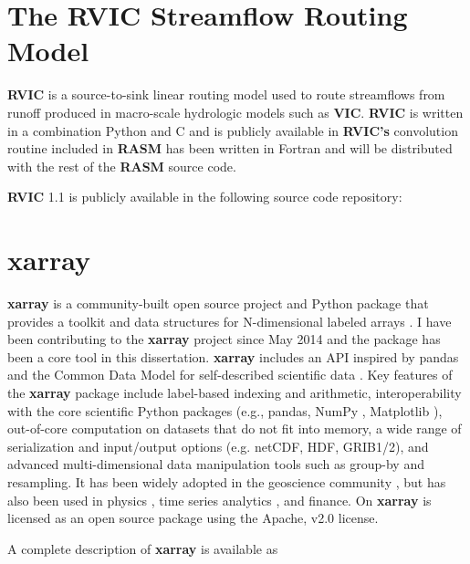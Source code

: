 \section{The RVIC Streamflow Routing Model}
\label{sec:rvic_dev}

\textbf{RVIC} is a source-to-sink linear routing model used to route streamflows from runoff produced in macro-scale hydrologic models such as \textbf{VIC}.
\textbf{RVIC} is written in a combination Python and C and is publicly available in \citet{Hamman_2015}
\textbf{RVIC's} convolution routine included in \textbf{RASM} has been written in Fortran and will be distributed with the rest of the \textbf{RASM} source code.

\textbf{RVIC} 1.1 is publicly available in the following source code repository:


\section{xarray}
\label{sec:xarray_dev}

\textbf{xarray} is a community-built open source project and Python package that provides a toolkit and data structures for N-dimensional labeled arrays \citep{Hoyer_2016}.
I have been contributing to the \textbf{xarray} project since May 2014 and the package has been a core tool in this dissertation.
\textbf{xarray} includes an API inspired by pandas \citep{mckinney_2010} and the Common Data Model for self-described scientific data \citep{Rew_1990,Brown_1993}.
Key features of the \textbf{xarray} package include label-based indexing and arithmetic, interoperability with the core scientific Python packages (e.g., pandas, NumPy \citep{Jones_2001}, Matplotlib \citep{van_der_Walt_2011}), out-of-core computation on datasets that do not fit into memory, a wide range of serialization and input/output options (e.g. netCDF, HDF, GRIB1/2), and advanced multi-dimensional data manipulation tools such as group-by and resampling.
It has been widely adopted in the geoscience community \citep[e.g.][]{xgcm,Dawson_2016a,Dawson_2016b}, but has also been used in physics \citep[e.g.][]{pycalphad}, time series analytics \citep{cesium}, and finance.
On
\textbf{xarray} is licensed as an open source package using the Apache, v2.0 license.

A complete description of \textbf{xarray} is available as

